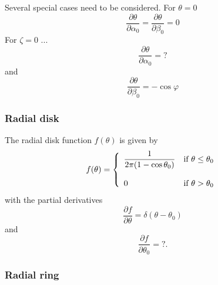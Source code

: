 \documentclass{article}[12pt,a4]
\begin{document}
Several special cases need to be considered.
For $\theta=0$
\begin{equation}
\frac{\partial \theta}{\partial \alpha_0} = \frac{\partial \theta}{\partial \beta_0} = 0
\end{equation}
For $\zeta=0$ ...
\begin{equation}
\frac{\partial \theta}{\partial \alpha_0} = ?
\end{equation}
and
\begin{equation}
\frac{\partial \theta}{\partial \beta_0} = - \cos \varphi
\end{equation}

\subsubsection{Radial disk}

The radial disk function $f(\theta)$ is given by
\begin{equation}
f(\theta) = \left \{
   \begin{array}{l l}
     \displaystyle \frac{1}{2 \pi (1 - \cos \theta_0)} & \mbox{if $\theta \le \theta_0$} \\ \\
     \displaystyle 0 & \mbox{if $\theta > \theta_0$}
   \end{array}
   \right .
\end{equation}
with the partial derivatives
\begin{equation}
\frac{\partial f}{\partial \theta}  = \delta(\theta - \theta_0)
\end{equation}
and
\begin{equation}
\frac{\partial f}{\partial \theta_0}  = ? .
\end{equation}

\subsubsection{Radial ring}
\end{document}
